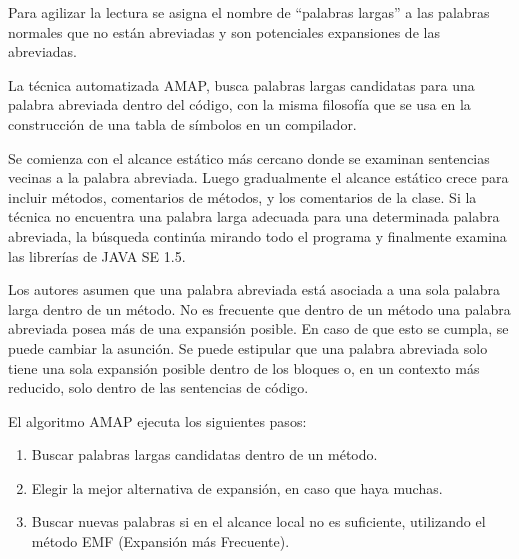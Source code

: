 Para agilizar la lectura se asigna el nombre de “palabras largas” a las palabras normales que no están abreviadas y son potenciales expansiones de las abreviadas.

La técnica automatizada AMAP, busca palabras largas candidatas para una palabra abreviada dentro del código, con la misma filosofía que se usa en la construcción de una tabla de símbolos en un compilador.

Se comienza con el alcance estático más cercano donde se examinan sentencias vecinas a la palabra abreviada. Luego gradualmente el alcance estático crece para incluir métodos, comentarios de métodos, y los comentarios de la clase. Si la técnica no encuentra una palabra larga adecuada para una determinada palabra abreviada, la búsqueda continúa mirando todo el programa y finalmente examina las librerías de JAVA SE 1.5. 

Los autores asumen que una palabra abreviada está asociada a una sola palabra larga dentro de un método. No es frecuente que dentro de un método una palabra abreviada posea más de una expansión posible. En caso de que esto se cumpla, se puede cambiar la asunción. Se puede estipular que una palabra abreviada solo tiene una sola expansión posible dentro de los bloques o, en un contexto más reducido, solo dentro de las sentencias de código.


El algoritmo AMAP ejecuta los siguientes pasos:

\begin{enumerate}
\itemsep0em%
\item Buscar palabras largas candidatas dentro de un método.
\item Elegir la mejor alternativa de expansión, en caso que haya muchas.
\item Buscar nuevas palabras si en el alcance local no es suficiente, utilizando el método EMF (Expansión más Frecuente).
\end{enumerate}

